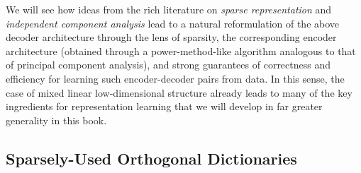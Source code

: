 \documentclass[../../book-main.tex]{subfiles}
\begin{document}
We will see how ideas from the rich literature on \textit{sparse representation} and \textit{independent component analysis} lead to a natural reformulation of the above decoder architecture through the lens of sparsity, the corresponding encoder architecture (obtained through a power-method-like algorithm analogous to that of principal component analysis), and strong guarantees of correctness and efficiency for learning such encoder-decoder pairs from data. In this sense, the case of mixed linear low-dimensional structure already leads to many of the key ingredients for representation learning that we will develop in far greater generality in this book.


\subsection{Sparsely-Used Orthogonal Dictionaries}

\end{document}
